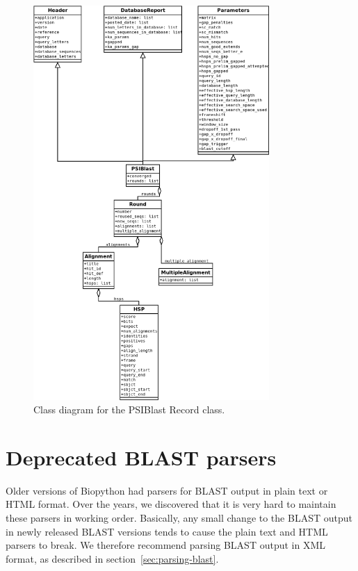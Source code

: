 \documentclass{report}
\begin{document}
\begin{latexonly}
\begin{figure}[htbp]
\centering
\includegraphics[width=0.8\textwidth]{images/PSIBlastRecord.png}
\caption{Class diagram for the PSIBlast Record class.}
\label{fig:psiblastrecord}
\end{figure}
\end{latexonly}

\section{Deprecated BLAST parsers}
\label{sec:parsing-blast-deprecated}

Older versions of Biopython had parsers for BLAST output in plain text or HTML
format. Over the years, we discovered that it is very hard to maintain these
parsers in working order. Basically, any small change to the BLAST output in
newly released BLAST versions tends to cause the plain text and HTML parsers
to break. We therefore recommend parsing BLAST output in XML format, as
described in section~\ref{sec:parsing-blast}.
\end{document}
